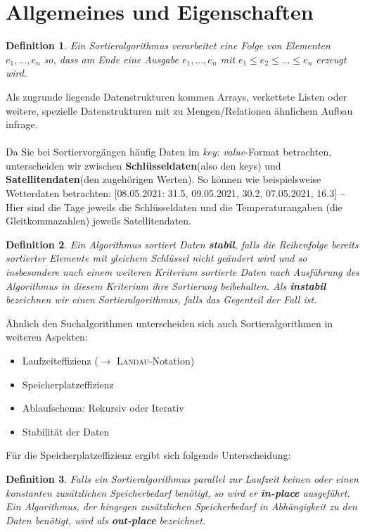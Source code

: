 \documentclass[11pt,a4paper]{scrartcl}
\newtheorem{definition}{Definition}
\begin{document}
\section{Allgemeines und Eigenschaften}
\begin{definition}
Ein Sortieralgorithmus verarbeitet eine Folge von Elementen $e_{1}, ..., e_{n}$ so, dass am Ende eine Ausgabe $e_{1}, ..., e_{n}$ mit $e_{1} \leq e_{2} \leq ... \leq e_{n}$ erzeugt wird.
\end{definition} 
Als zugrunde liegende Datenstrukturen kommen Arrays, verkettete Listen oder weitere, spezielle Datenstrukturen mit zu Mengen/Relationen ähnlichem Aufbau infrage. \\\\
Da Sie bei Sortiervorgängen häufig Daten im \textit{{key: value}}-Format betrachten, unterscheiden wir zwischen \textbf{Schlüsseldaten}(also den keys) und \textbf{Satellitendaten}(den zugehörigen Werten). So können wie beispielsweise Wetterdaten betrachten: [{08.05.2021: 31.5}, {09.05.2021, 30.2}, {07.05.2021, 16.3}] -- Hier sind die Tage jeweils die Schlüsseldaten und die Temperaturangaben (die Gleitkommazahlen) jeweils Satellitendaten.
\begin{definition} Ein Algorithmus sortiert Daten \textbf{stabil}, falls die Reihenfolge bereits sortierter Elemente mit gleichem Schlüssel nicht geändert wird und so insbesondere nach einem weiteren Kriterium sortierte Daten nach Ausführung des Algorithmus in diesem Kriterium ihre Sortierung beibehalten. Als \textbf{instabil} bezeichnen wir einen Sortieralgorithmus, falls das Gegenteil der Fall ist.
\end{definition}
Ähnlich den Suchalgorithmen unterscheiden sich auch Sortieralgorithmen in weiteren Aspekten: 
\begin{itemize}
\item Laufzeiteffizienz ($\to$ \textsc{Landau}-Notation)
\item Speicherplatzeffizienz
\item Ablaufschema: Rekursiv oder Iterativ
\item Stabilität der Daten
\end{itemize}
Für die Speicherplatzeffizienz ergibt sich folgende Unterscheidung:
\begin{definition}
Falls ein Sortieralgorithmus parallel zur Laufzeit keinen oder einen konstanten zusätzlichen Speicherbedarf benötigt, so wird er \textbf{in-place} ausgeführt. Ein Algorithmus, der hingegen zusätzlichen Speicherbedarf in Abhängigkeit zu den Daten benötigt, wird als \textbf{out-place} bezeichnet.
\end{definition}
\end{document}
